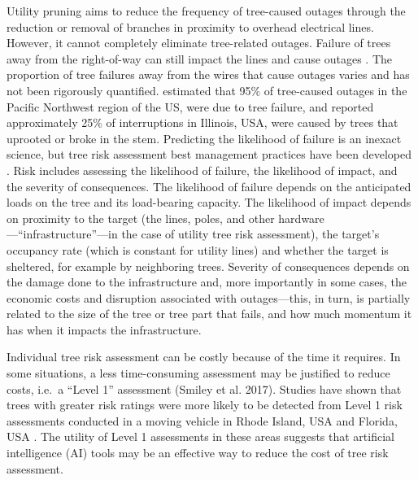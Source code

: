 \documentclass[11pt,twoside]{article}
\numberwithin{equation}{section}
\newcommand{\?}{\stackrel{?}{=}}
\begin{document}
Utility pruning aims to reduce the frequency of tree-caused outages through the reduction or removal of branches in proximity to overhead electrical lines.
However, it cannot completely eliminate tree-related outages. Failure of trees away from the right-of-way can still impact the
lines and cause outages \cite{guggenmoos2003effects}. The proportion of tree failures away from the wires that cause
outages varies and has not been rigorously quantified. \citet{guggenmoos2011treerelated} estimated that 95\% of
tree-caused outages in the Pacific Northwest region of the US, were due to tree failure, and \citet{wismer2018targeted}
reported approximately 25\% of interruptions in Illinois, USA, were caused by trees that uprooted or broke in the stem.
Predicting the likelihood of failure is an inexact science, but tree risk assessment best management practices have been
developed \cite{e.thomassmiley2017best,johnw.goodfellow2020best}. Risk includes assessing the likelihood of
failure, the likelihood of impact, and the severity of consequences. The likelihood of failure depends on the anticipated
loads on the tree and its load-bearing capacity. The likelihood of impact depends on proximity to the target (the lines,
poles, and other hardware---``infrastructure''---in the case of utility tree risk assessment), the target’s occupancy rate
(which is constant for utility lines) and whether the target is sheltered, for example by neighboring trees. Severity of
consequences depends on the damage done to the infrastructure and, more importantly in some cases, the economic costs
and disruption associated with outages---this, in turn, is partially related to the size of the tree or tree part that
fails, and how much momentum it has when it impacts the infrastructure.

Individual tree risk assessment can be costly because of the time it requires. In some situations, a less time-consuming
assessment may be justified to reduce costs, i.e.\ a ``Level 1'' assessment (Smiley et al. 2017). Studies have shown
that trees with greater risk ratings were more likely to be detected from Level 1 risk assessments conducted in a moving
vehicle in Rhode Island, USA \cite{rooney2005reliability} and Florida, USA \cite{koeser2016frequency} . The utility of
Level 1 assessments in these areas suggests that artificial intelligence (AI) tools may be an effective way to reduce
the cost of tree risk assessment.
\end{document}
